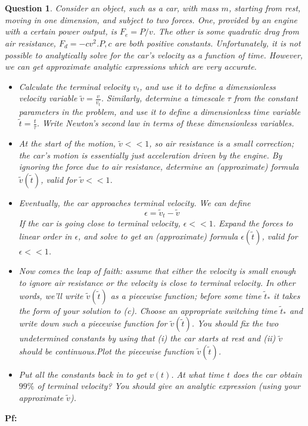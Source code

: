 \documentclass{article}
\newtheorem{question}{Question}
\begin{document}
\section{}%
\begin{question}\label{q3}
    Consider an object, such as a car, with mass $m$, starting from rest, moving in one dimension, and subject to two forces. One, provided by an engine with a certain power output, is $F_e = P/v$. The other is some quadratic drag from air resistance, $F_d = -cv^2$.$P,c$ are both positive constants. Unfortunately, it is not possible to analytically solve for the car's velocity as a function of time. However, we can get approximate analytic expressions which are very accurate.
    \begin{itemize}
        \item[(a)] Calculate the terminal velocity $v_t$, and use it to define a dimensionless velocity variable $\tilde{v}=\frac{v}{v_t}$. Similarly, determine a timescale $\tau$ from the constant parameters in the problem, and use it to define a dimensionless time variable $\tilde{t}=\frac{t}{\tau}$. Write Newton's second law in terms of these dimensionless variables.
        \item[(b)] At the start of the motion, $\tilde{v}<< 1$, so air resistance is a small correction; the car's motion is essentially just acceleration driven by the engine. By ignoring the force due to air resistance, determine an (approximate) formula $\tilde{v}(\tilde{t})$, valid for $\tilde{v}<<1$.
        \item[(c)]Eventually, the car approaches terminal velocity. We can define 
        $$\epsilon = \tilde{v}_t-\tilde{v}$$
        If the car is going close to terminal velocity, $\epsilon <<1$. Expand the forces to linear order in $\epsilon$, and solve to get an (approximate) formula $\epsilon(\tilde{t})$, valid for $\epsilon<<1$.
        \item[(d)] Now comes the leap of faith: assume that either the velocity is small enough to ignore air resistance or the velocity is close to terminal velocity. In other words, we'll write $\tilde{v}(\tilde{t})$ as a piecewise function; before some time $\tilde{t}_*$ it takes the form of your solution to (c). Choose an appropriate switching time $\tilde{t}_*$ and write down such a piecewise function for $\tilde{v}(\tilde{t})$. You should fix the two undetermined constants by using that (i) the car starts at rest and (ii) $\tilde{v}$ should be continuous.Plot the piecewise function $\tilde{v}(\tilde{t})$.
        \item[(e)] Put all the constants back in to get $v(t)$. At what time $t$ does the car obtain $99\%$ of terminal velocity? You should give an analytic expression (using your approximate $\tilde{v}$). 
    \end{itemize}
\end{question}
\textbf{Pf:}
\end{document}
